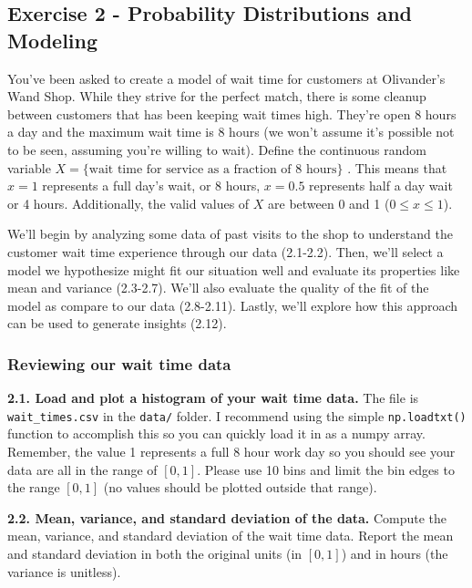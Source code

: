 \documentclass[
  letterpaper,
  DIV=11,
  numbers=noendperiod]{scrartcl}
\begin{document}
\newpage{}

\subsection{Exercise 2 - Probability Distributions and
Modeling}\label{exercise-2---probability-distributions-and-modeling}

You've been asked to create a model of wait time for customers at
Olivander's Wand Shop. While they strive for the perfect match, there is
some cleanup between customers that has been keeping wait times high.
They're open 8 hours a day and the maximum wait time is 8 hours (we
won't assume it's possible not to be seen, assuming you're willing to
wait). Define the continuous random variable
\(X = \{\text{wait time for service as a fraction of 8 hours}\}\) . This
means that \(x=1\) represents a full day's wait, or 8 hours, \(x=0.5\)
represents half a day wait or 4 hours. Additionally, the valid values of
\(X\) are between 0 and 1 (\(0\leq x \leq 1\)).

We'll begin by analyzing some data of past visits to the shop to
understand the customer wait time experience through our data (2.1-2.2).
Then, we'll select a model we hypothesize might fit our situation well
and evaluate its properties like mean and variance (2.3-2.7). We'll also
evaluate the quality of the fit of the model as compare to our data
(2.8-2.11). Lastly, we'll explore how this approach can be used to
generate insights (2.12).

\subsubsection{Reviewing our wait time
data}\label{reviewing-our-wait-time-data}

\textbf{2.1. Load and plot a histogram of your wait time data.} The file
is \texttt{wait\_times.csv} in the \texttt{data/} folder. I recommend
using the simple \texttt{np.loadtxt()} function to accomplish this so
you can quickly load it in as a numpy array. Remember, the value 1
represents a full 8 hour work day so you should see your data are all in
the range of \([0,1]\). Please use 10 bins and limit the bin edges to
the range \([0,1]\) (no values should be plotted outside that range).

\textbf{2.2. Mean, variance, and standard deviation of the data.}
Compute the mean, variance, and standard deviation of the wait time
data. Report the mean and standard deviation in both the original units
(in \([0,1]\)) and in hours (the variance is unitless).
\end{document}
